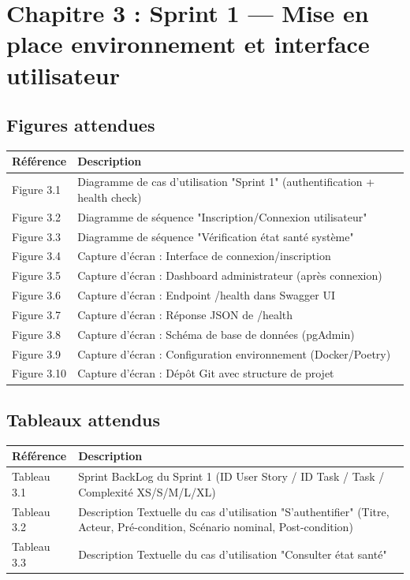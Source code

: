 \documentclass[12pt,a4paper]{article}
\begin{document}
\section{Chapitre 3 : Sprint 1 — Mise en place environnement et interface utilisateur}

\subsection*{Figures attendues}

\begin{longtable}{p{2cm} p{12cm}}
    \textbf{Référence} & \textbf{Description} \\
    \midrule
    \endhead
    
    Figure 3.1 & Diagramme de cas d'utilisation "Sprint 1" (authentification + health check) \\
    Figure 3.2 & Diagramme de séquence "Inscription/Connexion utilisateur" \\
    Figure 3.3 & Diagramme de séquence "Vérification état santé système" \\
    Figure 3.4 & Capture d'écran : Interface de connexion/inscription \\
    Figure 3.5 & Capture d'écran : Dashboard administrateur (après connexion) \\
    Figure 3.6 & Capture d'écran : Endpoint /health dans Swagger UI \\
    Figure 3.7 & Capture d'écran : Réponse JSON de /health \\
    Figure 3.8 & Capture d'écran : Schéma de base de données (pgAdmin) \\
    Figure 3.9 & Capture d'écran : Configuration environnement (Docker/Poetry) \\
    Figure 3.10 & Capture d'écran : Dépôt Git avec structure de projet \\
    \bottomrule
\end{longtable}

\subsection*{Tableaux attendus}

\begin{longtable}{p{2cm} p{12cm}}
    \textbf{Référence} & \textbf{Description} \\
    \midrule
    \endhead
    
    Tableau 3.1 & Sprint BackLog du Sprint 1 (ID User Story / ID Task / Task / Complexité XS/S/M/L/XL) \\
    Tableau 3.2 & Description Textuelle du cas d'utilisation "S'authentifier" (Titre, Acteur, Pré-condition, Scénario nominal, Post-condition) \\
    Tableau 3.3 & Description Textuelle du cas d'utilisation "Consulter état santé" \\
    \bottomrule
\end{longtable}
\end{document}
